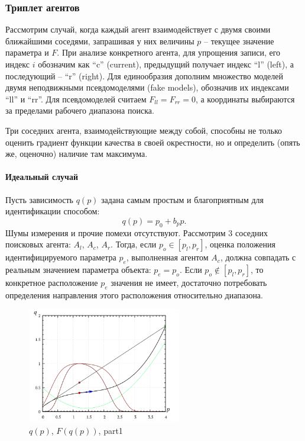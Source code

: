 \subsubsection{Триплет агентов}

Рассмотрим случай, когда каждый агент взаимодействует с двумя своими ближайшими соседями,
запрашивая у них величины $p$ -- текущее значение параметра и $F$.
При анализе конкретного агента, для упрощения записи, его индекс $i$ обозначим как ``c'' (current),
предыдущий получает индекс ``l'' (left), а последующий -- ``r'' (right).
Для единообразия дополним множество моделей двумя неподвижными псевдомоделями (fake models),
обозначив их индексами ``ll'' и ``rr''. Для псевдомоделей считаем $  F_{ll} = F_{rr} = 0$,
а координаты выбираются за пределами рабочего диапазона поиска.



Три соседних агента, взаимодействующие между собой,
способны не только оценить градиент функции качества в своей окрестности,
но и определить (опять же, оценочно) наличие там максимума.

\paragraph{Идеальный случай}

Пусть зависимость $q(p)$ задана самым простым и благоприятным для идентификации способом:
%
\[
  q(p) = p_0 + b_p p .
\]
Шумы измерения и прочие помехи отсутствуют.
Рассмотрим 3 соседних поисковых агента: $A_l$, $A_c$, $A_r$.
Тогда, если $p_o \in [ p_l, p_r ] $, оценка положения
идентифицируемого параметра $p_e$, выполненная агентом $A_c$,
должна совпадать с реальным значением параметра объекта: $p_e = p_o $.
Если $p_o \notin [ p_l, p_r ] $, то конкретное расположение
$p_e$ значения не имеет, достаточно потребовать определения направления
этого расположения относительно диапазона. %


\begin{figure}[htb!]
  \centerline{\includegraphics[width=0.6\textwidth]{pq_1x2.png} }
  \caption{ $q(p)$, $F(q(p))$, part1 }
  \label{atu:pq_1x2}
\end{figure}

